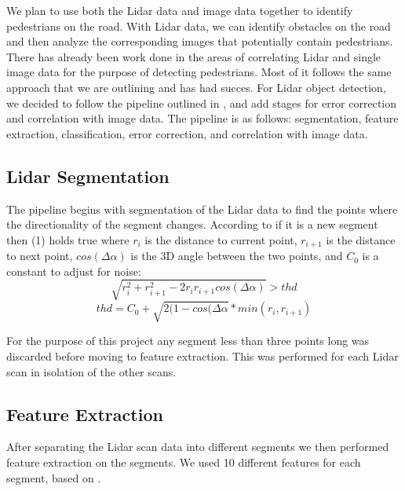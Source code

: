 \documentclass[10pt,twocolumn,letterpaper]{article}
\begin{document}
  We plan to use both the Lidar data and image data together to identify
  pedestrians on the road. With Lidar data, we can identify obstacles on the
  road and then analyze the corresponding images that potentially contain
  pedestrians. There has already been work done in the areas of correlating
  Lidar and single image data for the purpose of detecting pedestrians. Most
  of it follows the same approach that we are outlining and has had succes.
  For Lidar object detection, we decided to follow the pipeline outlined
  in \cite{journal}, and add stages for error correction and correlation with
  image data. The pipeline is as follows: segmentation, feature
  extraction, classification, error correction, and correlation with image data.

  \subsection{Lidar Segmentation}
  The pipeline begins with segmentation of the Lidar data
  to find the points where the directionality of the segment changes.
  According to \cite{conf} if it
  is a new segment then (1) holds true where $r_i$ is the
  distance to current point, $r_{i+1}$ is the distance to next point,
  $cos(\Delta \alpha)$ is the 3D angle between the two points, and $C_0$ is a
  constant to adjust for noise:
   \begin{equation} \sqrt{r_{i}^{2} + r_{i+1}^{2} - 2 r_{i} r_{i+1}
   cos(\Delta \alpha)} > thd \end{equation}
   \begin{equation} thd = C_0 + \sqrt{2(1-cos(\Delta \alpha} * min(r_i,
   r_{i+1}) \end{equation}

  For the purpose of this project any segment less than three points long was
  discarded before moving to feature extraction. This was performed for each
  Lidar scan in isolation of the other scans.

  \subsection{Feature Extraction}
  After separating the Lidar scan data into different segments we then
  performed feature extraction on the segments. We used 10 different features
  for each segment, based on \cite{journal}.
\end{document}
